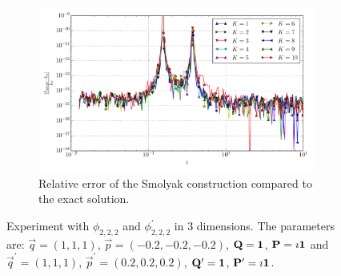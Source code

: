 \documentclass[a4paper,10pt]{article}
\begin{document}
\begin{figure}[ht!]
\begin{subfigure}[t]{0.5\linewidth}
    \includegraphics[width=\linewidth]{./plots/tp_sg_3d_conv_eps_(2,2,2)_(2,2,2)_err_rel_nsd_gk.pdf}
    \caption{Relative error of the Smolyak construction compared to the exact solution.}
    \label{fig:tp_sg_3d_conv_eps_222_222_err_rel_nsd_gk}
  \end{subfigure}
  \label{fig:tp_sg_3d_conv_eps_222_222}
  \caption{Experiment with $\phi_{2,2,2}$ and $\phi_{2,2,2}^{\prime}$
  in 3 dimensions.
  The parameters are:
  $\vec{q} = (1, 1, 1)$,
  $\vec{p} = (-0.2, -0.2, -0.2)$,
  $\mathbf{Q} = \mathbf{1}$,
  $\mathbf{P} = \imath \mathbf{1}$
  and
  $\vec{q}^\prime = (1, 1, 1)$,
  $\vec{p}^\prime = (0.2, 0.2, 0.2)$,
  $\mathbf{Q}^\prime = \mathbf{1}$,
  $\mathbf{P}^\prime = \imath \mathbf{1}$.}
\end{figure}
\end{document}
